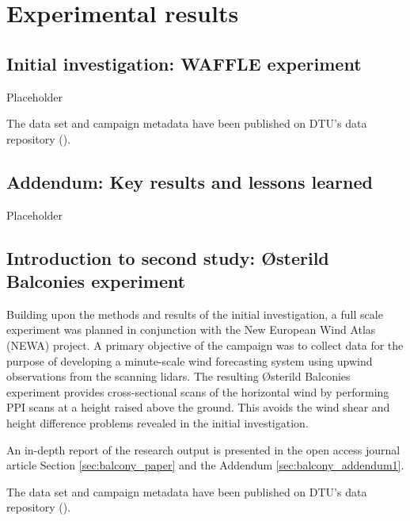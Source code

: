 \chapter{Experimental results}
\label{sec:results}

\clearpage
\section{Initial investigation: WAFFLE experiment}
\label{sec:waffle}

Placeholder

The data set and campaign metadata have been published on DTU's data repository (\cite{waffle_dataset}).

\clearpage
\section{Addendum: Key results and lessons learned}
\label{sec:waffle_addendum}

Placeholder

\clearpage
\section{Introduction to second study: 
{\O}sterild Balconies experiment}
\label{sec:balcony_intro}

Building upon the methods and results of the initial investigation, a full scale experiment was planned in conjunction with the New European Wind Atlas (NEWA) project. A primary objective of the campaign was to collect data for the purpose of developing a minute-scale wind forecasting system using upwind observations from the scanning lidars. The resulting {\O}sterild Balconies experiment provides cross-sectional scans of the horizontal wind by performing PPI scans at a height raised above the ground. This avoids the wind shear and height difference problems revealed in the initial investigation.

\noindent
An in-depth report of the research output is presented in the open access journal article Section \ref{sec:balcony_paper} and the Addendum \ref{sec:balcony_addendum1}.

\noindent
The data set and campaign metadata have been published on DTU's data repository (\cite{balcony_dataset}).

